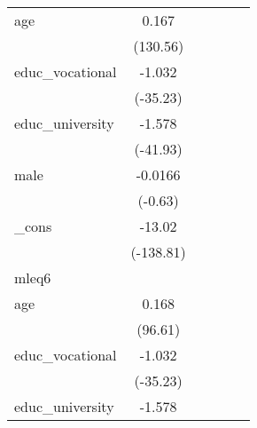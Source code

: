 {\begin{tabular}{l*{5}{c}}
age         &       0.167\sym{***}&                     &                     &                     &                     \\
            &    (130.56)         &                     &                     &                     &                     \\
[1em]
educ\_vocational&      -1.032\sym{***}&                     &                     &                     &                     \\
            &    (-35.23)         &                     &                     &                     &                     \\
[1em]
educ\_university&      -1.578\sym{***}&                     &                     &                     &                     \\
            &    (-41.93)         &                     &                     &                     &                     \\
[1em]
male        &     -0.0166         &                     &                     &                     &                     \\
            &     (-0.63)         &                     &                     &                     &                     \\
[1em]
\_cons      &      -13.02\sym{***}&                     &                     &                     &                     \\
            &   (-138.81)         &                     &                     &                     &                     \\
\hline
mleq6       &                     &                     &                     &                     &                     \\
age         &       0.168\sym{***}&                     &                     &                     &                     \\
            &     (96.61)         &                     &                     &                     &                     \\
[1em]
educ\_vocational&      -1.032\sym{***}&                     &                     &                     &                     \\
            &    (-35.23)         &                     &                     &                     &                     \\
[1em]
educ\_university&      -1.578\sym{***}&                     &                     &                     &                     \\

\end{tabular}}
